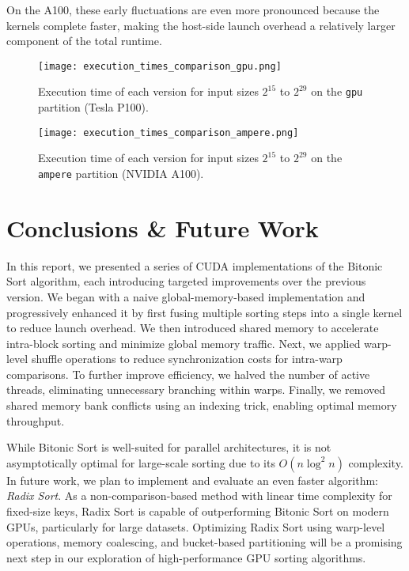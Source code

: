 \documentclass{article}
\begin{document}
On the A100, these early fluctuations are even more pronounced because the kernels complete faster, making 
the host-side launch overhead a relatively larger component of the total runtime.

\begin{figure}[H]
    \centering
    \texttt{[image: execution\_times\_comparison\_gpu.png]}
    \caption{Execution time of each version for input sizes $2^{15}$ to $2^{29}$ on the \texttt{gpu} 
    partition (Tesla P100).}
    \label{fig:execution_times_comparison_gpu}
\end{figure}

\begin{figure}[H]
    \centering
    \texttt{[image: execution\_times\_comparison\_ampere.png]}
    \caption{Execution time of each version for input sizes $2^{15}$ to $2^{29}$ on the \texttt{ampere} 
    partition (NVIDIA A100).}
    \label{fig:execution_times_comparison_ampere}
\end{figure}

\section*{Conclusions \& Future Work}

In this report, we presented a series of CUDA implementations of the Bitonic Sort algorithm, each introducing
targeted improvements over the previous version. We began with a naive global-memory-based implementation and 
progressively enhanced it by first fusing multiple sorting steps into a single kernel to reduce launch overhead. 
We then introduced shared memory to accelerate intra-block sorting and minimize global memory traffic. Next, we 
applied warp-level shuffle operations to reduce synchronization costs for intra-warp comparisons. To further 
improve efficiency, we halved the number of active threads, eliminating unnecessary branching within warps. 
Finally, we removed shared memory bank conflicts using an indexing trick, enabling optimal memory throughput. 


While Bitonic Sort is well-suited for parallel architectures, it is not asymptotically optimal for large-scale 
sorting due to its $O(n \log^2 n)$ complexity. In future work, we plan to implement and evaluate an even faster
algorithm: \textit{Radix Sort}. As a non-comparison-based method with linear time complexity for fixed-size keys, 
Radix Sort is capable of outperforming Bitonic Sort on modern GPUs, particularly for large datasets. Optimizing 
Radix Sort using warp-level operations, memory coalescing, and bucket-based partitioning will be a promising next 
step in our exploration of high-performance GPU sorting algorithms.
\end{document}
